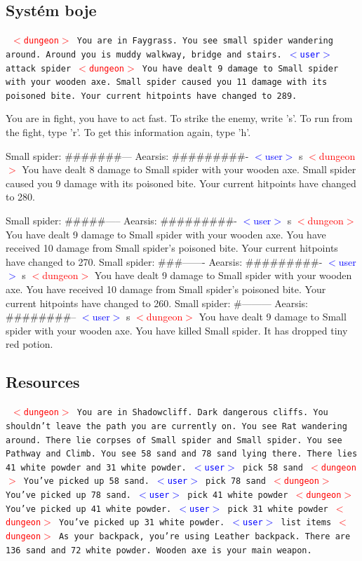 \documentclass[11pt, a4paper]{article}
\newenvironment{example}%
{\smallskip\noindent\ignorespaces\obeylines\tt}%
{\smallskip\par\noindent
\ignorespacesafterend}
\def\user{\textcolor{blue}{$<$user$>$ }}
\def\dung{\textcolor{red}{$<$dungeon$>$ }}
\begin{document}
\subsection{Systém boje}
\begin{example}
\dung You are in Faygrass. You see small spider wandering around. Around you is muddy walkway, bridge and stairs. 
\user attack spider
\dung You have dealt 9 damage to Small spider with your wooden axe. Small spider caused you 11 damage with its poisoned bite. Your current hitpoints have changed to 289.
 
You are in fight, you have to act fast. To strike the enemy, write 's'. To run from the fight, type 'r'. To get this information again, type 'h'.

Small spider: \#\#\#\#\#\#\#--- Aearsis: \#\#\#\#\#\#\#\#\#- 
\user s
\dung You have dealt 8 damage to Small spider with your wooden axe. Small spider caused you 9 damage with its poisoned bite. Your current hitpoints have changed to 280. 

Small spider: \#\#\#\#\#----- Aearsis: \#\#\#\#\#\#\#\#\#- 
\user s
\dung You have dealt 9 damage to Small spider with your wooden axe. You have received 10 damage from Small spider's poisoned bite. Your current hitpoints have changed to 270. 
Small spider: \#\#\#------- Aearsis: \#\#\#\#\#\#\#\#\#- 
\user s
\dung You have dealt 9 damage to Small spider with your wooden axe. You have received 10 damage from Small spider's poisoned bite. Your current hitpoints have changed to 260. 
Small spider: \#--------- Aearsis: \#\#\#\#\#\#\#\#-- 
\user s
\dung You have dealt 9 damage to Small spider with your wooden axe. You have killed Small spider. It has dropped tiny red potion. 
\end{example}
\subsection{Resources}
\begin{example}
\dung You are in Shadowcliff. Dark dangerous cliffs. You shouldn't leave the path you are currently on. You see Rat wandering around. There lie corpses of Small spider and Small spider. You see Pathway and Climb. You see 58 sand and 78 sand lying there. There lies 41 white powder and 31 white powder.
\user pick 58 sand
\dung You've picked up 58 sand.
\user pick 78 sand
\dung You've picked up 78 sand.
\user pick 41 white powder
\dung You've picked up 41 white powder.
\user pick 31 white powder
\dung You've picked up 31 white powder.
\user list items
\dung As your backpack, you're using Leather backpack. There are 136 sand and 72 white powder. Wooden axe is your main weapon.
\end{example}
\end{document}
